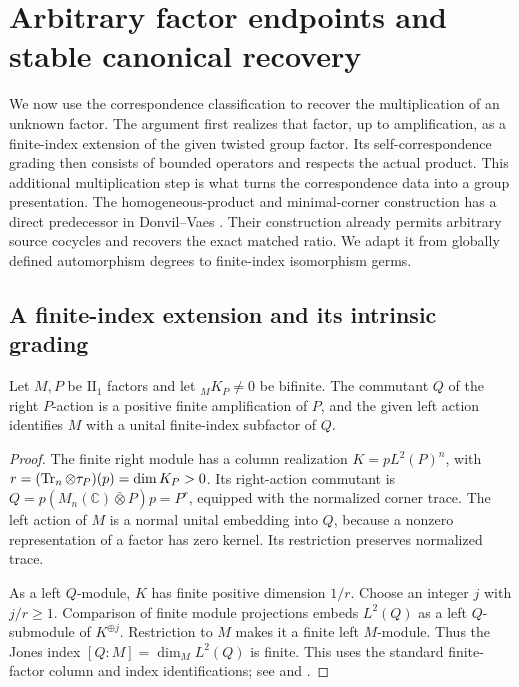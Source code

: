 \section{Arbitrary factor endpoints and stable canonical recovery}
\label{sec:endpoints}

We now use the correspondence classification to recover the multiplication
of an unknown factor.  The argument first realizes that factor, up to
amplification, as a finite-index extension of the given twisted group
factor.  Its self-correspondence grading then consists of bounded
operators and respects the actual product.  This additional multiplication
step is what turns the correspondence data into a group presentation.
The homogeneous-product and minimal-corner construction has a direct
predecessor in Donvil--Vaes \cite[Proposition~6.5 and Theorem~6.6]{DonvilVaes2025}.
Their construction already permits arbitrary source cocycles and recovers
the exact matched ratio. We adapt it from globally defined automorphism
degrees to finite-index isomorphism germs.

\subsection{A finite-index extension and its intrinsic grading}

\begin{lemma}
\label{lem:endpoints-extension}
Let \(M,P\) be \(\mathrm{II}_1\) factors and let \({}_M K_P\ne0\) be
bifinite.  The commutant \(Q\) of the right \(P\)-action is a positive
finite amplification of \(P\), and the given left action identifies
\(M\) with a unital finite-index subfactor of \(Q\).
\end{lemma}

\begin{proof}
The finite right module has a column realization
\(K=pL^2(P)^n\), with
\(r=(\operatorname{Tr}_n\otimes\tau_P)(p)=\dim K_P>0\).
Its right-action commutant is
\(Q=p(M_n(\mathbb C)\bar\otimes P)p=P^r\), equipped with the
normalized corner trace.  The left action of \(M\) is a normal unital
embedding into \(Q\), because a nonzero representation of a factor has
zero kernel.  Its restriction preserves normalized trace.

As a left \(Q\)-module, \(K\) has finite positive dimension \(1/r\).
Choose an integer \(j\) with \(j/r\geq1\).  Comparison of finite
module projections embeds \(L^2(Q)\) as a left \(Q\)-submodule of
\(K^{\oplus j}\).  Restriction to \(M\) makes it a finite left
\(M\)-module.  Thus the Jones index \([Q:M]=\dim_M L^2(Q)\) is
finite.  This uses the standard finite-factor column and index
identifications; see \cite{Jones1983} and \cite[Theorem~10.1.1, Proposition~10.1.3, and Theorem~10.2.1]{Jones2009}.
\end{proof}


